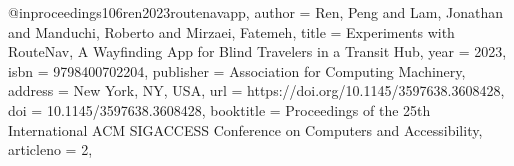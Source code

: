 @inproceedings{106ren2023routenavapp,
author = {Ren, Peng and Lam, Jonathan and Manduchi, Roberto and Mirzaei, Fatemeh},
title = {Experiments with RouteNav, A Wayfinding App for Blind Travelers in a Transit Hub},
year = {2023},
isbn = {9798400702204},
publisher = {Association for Computing Machinery},
address = {New York, NY, USA},
url = {https://doi.org/10.1145/3597638.3608428},
doi = {10.1145/3597638.3608428},
booktitle = {Proceedings of the 25th International ACM SIGACCESS Conference on Computers and Accessibility},
articleno = {2},
}